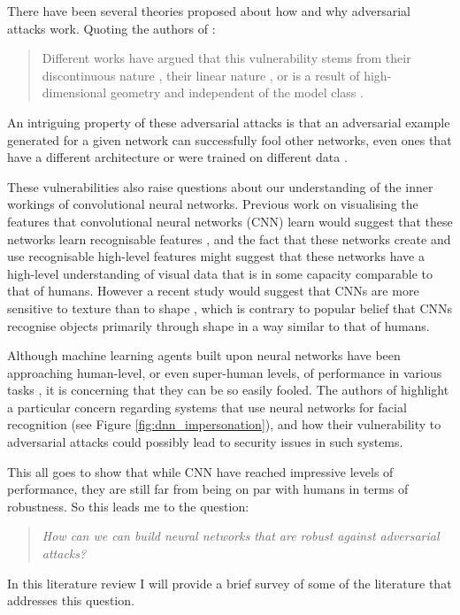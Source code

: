 \documentclass{article}
\begin{document}

There have been several theories proposed about how and why adversarial attacks work. Quoting the authors of \cite{schmidt2018adversarially}:  
\begin{quote}
Different works have argued that this vulnerability stems
from their discontinuous nature \cite{szegedy2013intriguing}, their linear nature \cite{goodfellow2014explaining}, or is a result of high-dimensional
geometry and independent of the model class \cite{gilmer2018adversarial}.
\end{quote}
An intriguing property of these adversarial attacks is that an adversarial example generated for a given network can successfully fool other networks, even ones that have a different architecture or were trained on different data \cite{szegedy2013intriguing}.

These vulnerabilities also raise questions about our understanding of the inner workings of convolutional neural networks. Previous work on visualising the features that convolutional neural networks (CNN) learn would suggest that these networks learn recognisable features \cite{simonyan2013deep, yosinski2015understanding, zintgraf2017visualizing}, and the fact that these networks create and use recognisable high-level features might suggest that these networks have a high-level understanding of visual data that is in some capacity comparable to that of humans.
However a recent study would suggest that CNNs are more sensitive to texture than to shape \cite{geirhos2018imagenet}, which is contrary to popular belief that CNNs recognise objects primarily through shape in a way similar to that of humans. 

Although machine learning agents built upon neural networks have been approaching human-level, or even super-human levels, of performance in various tasks \cite{taigman2014deepface, silver2017mastering}, it is concerning that they can be so easily fooled. The authors of \cite{sharif2016accessorize} highlight a particular concern regarding systems that use neural networks for facial recognition (see Figure \ref{fig:dnn_impersonation}), and how their vulnerability to adversarial attacks could possibly lead to security issues in such systems. 

This all goes to show that while CNN have reached impressive levels of performance, they are still far from being on par with humans in terms of robustness. So this leads me to the question:
\begin{quote}
    \textit{How can we can build neural networks that are robust against adversarial attacks?}
\end{quote} In this literature review I will provide a brief survey of some of the literature that addresses this question.
\end{document}

